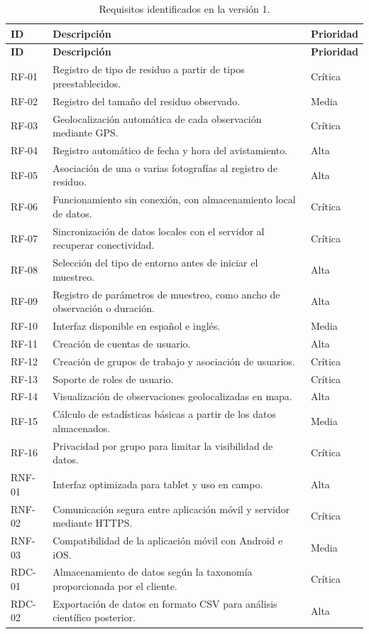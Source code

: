 {\small
\setlength{\tabcolsep}{4pt}
\renewcommand{\arraystretch}{1.08}
\begin{longtable}{>{\raggedright\arraybackslash}p{1.8cm} >{\raggedright\arraybackslash}p{10.1cm} >{\raggedright\arraybackslash}p{2.1cm}}
  \caption{Requisitos identificados en la versión 1.}
  \label{tab:requisitos_v1} \\
  \toprule
  \textbf{ID} & \textbf{Descripción} & \textbf{Prioridad} \\
  \midrule
  \endfirsthead
  \toprule
  \textbf{ID} & \textbf{Descripción} & \textbf{Prioridad} \\
  \midrule
  \endhead
  RF-01 & Registro de tipo de residuo a partir de tipos preestablecidos. & Crítica \\
  RF-02 & Registro del tamaño del residuo observado. & Media \\
  RF-03 & Geolocalización automática de cada observación mediante GPS. & Crítica \\
  RF-04 & Registro automático de fecha y hora del avistamiento. & Alta \\
  RF-05 & Asociación de una o varias fotografías al registro de residuo. & Alta \\
  RF-06 & Funcionamiento sin conexión, con almacenamiento local de datos. & Crítica \\
  RF-07 & Sincronización de datos locales con el servidor al recuperar conectividad. & Crítica \\
  RF-08 & Selección del tipo de entorno antes de iniciar el muestreo. & Alta \\
  RF-09 & Registro de parámetros de muestreo, como ancho de observación o duración. & Alta \\
  RF-10 & Interfaz disponible en español e inglés. & Media \\
  RF-11 & Creación de cuentas de usuario. & Alta \\
  RF-12 & Creación de grupos de trabajo y asociación de usuarios. & Crítica \\
  RF-13 & Soporte de roles de usuario. & Crítica \\
  RF-14 & Visualización de observaciones geolocalizadas en mapa. & Alta \\
  RF-15 & Cálculo de estadísticas básicas a partir de los datos almacenados. & Media \\
  RF-16 & Privacidad por grupo para limitar la visibilidad de datos. & Crítica \\
  RNF-01 & Interfaz optimizada para tablet y uso en campo. & Alta \\
  RNF-02 & Comunicación segura entre aplicación móvil y servidor mediante HTTPS. & Crítica \\
  RNF-03 & Compatibilidad de la aplicación móvil con Android e iOS. & Media \\
  RDC-01 & Almacenamiento de datos según la taxonomía proporcionada por el cliente. & Crítica \\
  RDC-02 & Exportación de datos en formato CSV para análisis científico posterior. & Alta \\
  \bottomrule
\end{longtable}
}

